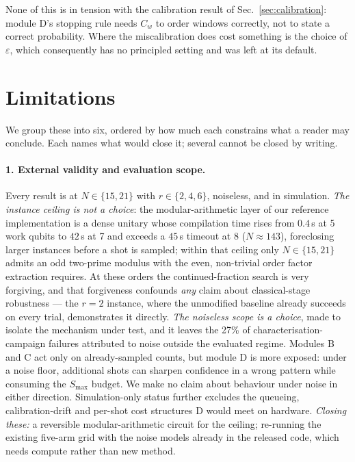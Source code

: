 \documentclass[preprint,11pt]{elsarticle}
\newcommand{\Cw}{C_w}
\newcommand{\Smax}{S_{\max}}
\begin{document}
None of this is in tension with the calibration result of
Sec.~\ref{sec:calibration}: module D's stopping rule needs $\Cw$ to order
windows correctly, not to state a correct probability. Where the
miscalibration does cost something is the choice of $\varepsilon$, which
consequently has no principled setting and was left at its default.

\section{Limitations}
\label{sec:limitations}

We group these into six, ordered by how much each constrains what a
reader may conclude. Each names what would close it; several cannot be
closed by writing.

\paragraph{1. External validity and evaluation scope.}
Every result is at $N\in\{15,21\}$ with $r\in\{2,4,6\}$, noiseless, and
in simulation. \emph{The instance ceiling is not a choice}: the
modular-arithmetic layer of our reference implementation is a dense
unitary whose compilation time rises from $0.4$\,s at 5 work qubits to
$42$\,s at 7 and exceeds a $45$\,s timeout at 8 ($N\approx143$),
foreclosing larger instances before a shot is sampled; within that
ceiling only $N\in\{15,21\}$ admits an odd two-prime modulus with the
even, non-trivial order factor extraction requires. At these orders the
continued-fraction search is very forgiving, and that forgiveness
confounds \emph{any} claim about classical-stage robustness --- the $r=2$
instance, where the unmodified baseline already succeeds on every trial,
demonstrates it directly. \emph{The noiseless scope is a choice}, made to
isolate the mechanism under test, and it leaves the 27\% of
characterisation-campaign failures attributed to noise outside the
evaluated regime. Modules B and C act only on already-sampled counts, but
module D is more exposed: under a noise floor, additional shots can
sharpen confidence in a wrong pattern while consuming the $\Smax$ budget.
We make no claim about behaviour under noise in either direction.
Simulation-only status further excludes the queueing, calibration-drift
and per-shot cost structures D would meet on hardware. \emph{Closing
these:} a reversible modular-arithmetic circuit \cite{cuccaro2004} for
the ceiling; re-running the existing five-arm grid with the noise models
already in the released code, which needs compute rather than new
method.
\end{document}
